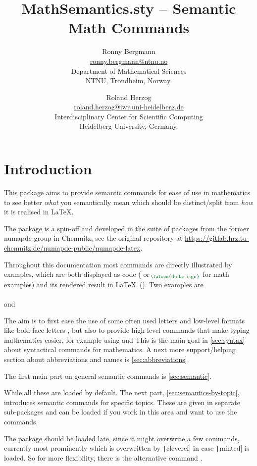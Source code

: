 \documentclass[english,a4paper,DIV=12,parskip=full,oneside]{scrartcl}
\date{\ISOToday}
\author{%
    Ronny Bergmann\\[.25\baselineskip]%
    \small\href{mailto:ronny.bergmann@ntnu.no}{ronny.bergmann@ntnu.no}\\[.125\baselineskip]
    \small Department of Mathematical Sciences\\%
    \small NTNU, Trondheim, Norway.%
    \and
    Roland Herzog\\[.25\baselineskip]%
    \small\href{mailto:roland.herzog@iwr.uni-heidelberg.de}{roland.herzog@iwr.uni-heidelberg.de}\\[.125\baselineskip]
    \small Interdisciplinary Center for Scientific Computing\\%
    \small Heidelberg University, Germany.%
    }
\title{MathSemantics.sty – Semantic Math Commands}
\begin{document}
    \maketitle
    \tableofcontents
    \section{Introduction}
    This package aims to provide semantic commands for ease of use in mathematics
    to see better \emph{what} you semantically mean which should be distinct/split
    from \emph{how} it is realised in \LaTeX.

    The package is a spin-off and developed in the suite of packages from the former numapde-group in Chemnitz,
    see the original repository at \url{https://gitlab.hrz.tu-chemnitz.de/numapde-public/numapde-latex}.

    Throughout this documentation most commands are directly illustrated by examples, which are
    both displayed as code ( or $_{\hspace{-.5ex}\text{\color{TolMutedGreen}\faIcon{dollar-sign}}}$ for math examples) and its rendered result in \LaTeX\ (\faEye[regular]).
    Two examples are\\
    \mathCodeExample{\bbR}\\
    and\\
    \codeExample{\eg}

    The aim is to first ease the use of some often used letters and low-level formats like
    bold face letters \mathCodeExample{\bbR}, but also to provide high level commands that
    make typing mathematics easier, for example using  and  
    This is the main goal in \cref{sec:syntax} about syntactical commands for mathematics.
    A next more support/helping section about abbreviations and names is \cref{sec:abbreviations}.

    The first main part on general semantic commands is \cref{sec:semantic}.

    While all these are loaded by default. The next part, \cref{sec:semantics-by-topic},
    introduces semantic commands for specific topics.
    These are given in separate sub-packages and can be loaded if you work in this area and want to use the commands.

    The package should be loaded late, since it might overwrite a few commands,
    currently most prominently \codeCommand{\d} which is overwritten by \texttt|cleveref| in case \texttt|minted| is loaded.
    So for more flexibility, there is the alternative command \codeCommand{\dInt}.
\end{document}

